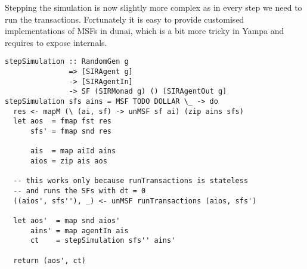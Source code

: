 Stepping the simulation is now slightly more complex as in every step we need to run the transactions. Fortunately it is easy to provide customised implementations of MSFs in dunai, which is a bit more tricky in Yampa and requires to expose internals.

\begin{verbatim}
stepSimulation :: RandomGen g
               => [SIRAgent g]
               -> [SIRAgentIn] 
               -> SF (SIRMonad g) () [SIRAgentOut g]
stepSimulation sfs ains = MSF TODO DOLLAR \_ -> do
  res <- mapM (\ (ai, sf) -> unMSF sf ai) (zip ains sfs)
  let aos  = fmap fst res
      sfs' = fmap snd res

      ais  = map aiId ains
      aios = zip ais aos

  -- this works only because runTransactions is stateless
  -- and runs the SFs with dt = 0
  ((aios', sfs''), _) <- unMSF runTransactions (aios, sfs')

  let aos'  = map snd aios'
      ains' = map agentIn ais
      ct    = stepSimulation sfs'' ains'

  return (aos', ct)
\end{verbatim}

